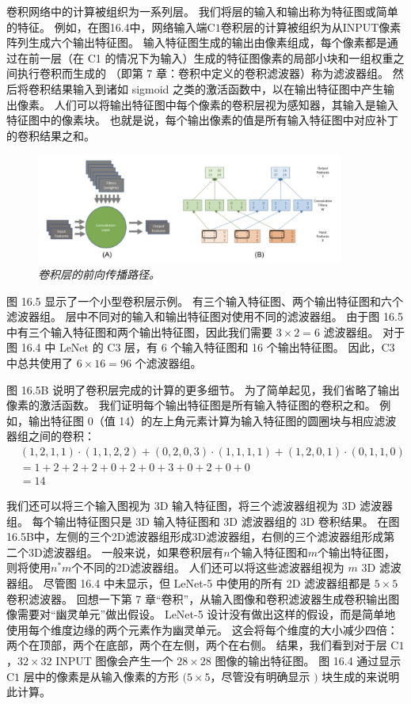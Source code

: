 卷积网络中的计算被组织为一系列层。 我们将层的输入和输出称为特征图或简单的特征。 
例如，在图16.4中，网络输入端$\mathrm{C} 1$卷积层的计算被组织为从INPUT像素阵列生成六个输出特征图。 
输入特征图生成的输出由像素组成，每个像素都是通过在前一层（在 C1 的情况下为输入）生成的特征图像素的局部小块和一组权重之间执行卷积而生成的 （即第 7 章：卷积中定义的卷积滤波器）称为滤波器组。 
然后将卷积结果输入到诸如 sigmoid 之类的激活函数中，以在输出特征图中产生输出像素。 
人们可以将输出特征图中每个像素的卷积层视为感知器，其输入是输入特征图中的像素块。 
也就是说，每个输出像素的值是所有输入特征图中对应补丁的卷积结果之和。

\begin{figure}[H]
	\centering
	\includegraphics[width=0.9\textwidth]{figs/F16.5.png}
	\caption{\textit{卷积层的前向传播路径。}}
\end{figure}

图 16.5 显示了一个小型卷积层示例。 有三个输入特征图、两个输出特征图和六个滤波器组。 
层中不同对的输入和输出特征图对使用不同的滤波器组。 
由于图 16.5 中有三个输入特征图和两个输出特征图，因此我们需要 $3 \times 2=6$ 滤波器组。 
对于图 16.4 中 LeNet 的 C3 层，有 6 个输入特征图和 16 个输出特征图。 
因此，$\mathrm{C} 3$ 中总共使用了 $6 \times 16=96$ 个滤波器组。

图 16.5B 说明了卷积层完成的计算的更多细节。 为了简单起见，我们省略了输出像素的激活函数。 
我们证明每个输出特征图是所有输入特征图的卷积之和。 
例如，输出特征图 0（值 14）的左上角元素计算为输入特征图的圆圈块与相应滤波器组之间的卷积：
$$
\begin{aligned}
& (1,2,1,1) \cdot(1,1,2,2)+(0,2,0,3) \cdot(1,1,1,1)+(1,2,0, 1) \cdot(0,1,1,0) \\
& =1+2+2+2+0+2+0+3+0+2+0+0 \\
&=14
\end{aligned}
$$

我们还可以将三个输入图视为 3D 输入特征图，将三个滤波器组视为 3D 滤波器组。 
每个输出特征图只是 $3 \mathrm{D}$ 输入特征图和 $3 \mathrm{D}$ 滤波器组的 3D 卷积结果。 
在图16.5B中，左侧的三个2D滤波器组形成3D滤波器组，右侧的三个滤波器组形成第二个3D滤波器组。 
一般来说，如果卷积层有$n$个输入特征图和$m$个输出特征图，则将使用$n^{*} m$个不同的2D滤波器组。 
人们还可以将这些滤波器组视为 $m$ 3D 滤波器组。 
尽管图 16.4 中未显示，但 LeNet-5 中使用的所有 2D 滤波器组都是 $5 \times 5$ 卷积滤波器。 
回想一下第 7 章“卷积”，从输入图像和卷积滤波器生成卷积输出图像需要对“幽灵单元”做出假设。 
LeNet-5 设计没有做出这样的假设，而是简单地使用每个维度边缘的两个元素作为幽灵单元。 
这会将每个维度的大小减少四倍：两个在顶部，两个在底部，两个在左侧，两个在右侧。 
结果，我们看到对于层 $\mathrm{C} 1$，$32 \times 32$ INPUT 图像会产生一个 $28 \times 28$ 图像的输出特征图。 
图 16.4 通过显示 $\mathrm{C} 1$ 层中的像素是从输入像素的方形 $(5 \times 5$，尽管没有明确显示 $)$ 块生成的来说明此计算。

